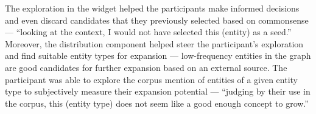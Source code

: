 The exploration in the \system widget helped the participants make informed decisions and even discard candidates that they previously selected based on commonsense --- ``looking at the context, I would not have selected this (entity) as a seed.'' Moreover, the distribution component helped steer the participant's exploration and find suitable entity types for expansion --- low-frequency entities in the graph are good candidates for further expansion based on an external source. The participant was able to explore the corpus mention of entities of a given entity type to subjectively measure their expansion potential --- ``judging by their use in the corpus, this (entity type) does not seem like a good enough concept to grow.'' 





